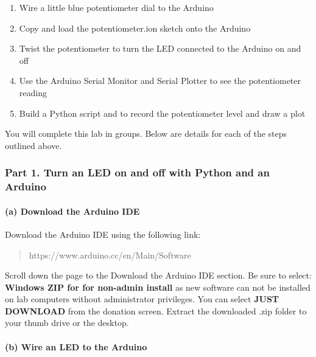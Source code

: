\documentclass[11pt]{article}
\begin{document}
\begin{enumerate}
\def\labelenumi{(\alph{enumi})}
\item
  Wire a little blue potentiometer dial to the Arduino
\item
  Copy and load the potentiometer.ion sketch onto the Arduino
\item
  Twist the potentiometer to turn the LED connected to the Arduino on
  and off
\item
  Use the Arduino Serial Monitor and Serial Plotter to see the
  potentiometer reading
\item
  Build a Python script and to record the potentiometer level and draw a
  plot
\end{enumerate}

    You will complete this lab in groups. Below are details for each of the
steps outlined above.

\hypertarget{part-1.-turn-an-led-on-and-off-with-python-and-an-arduino}{%
\subsubsection{Part 1. Turn an LED on and off with Python and an
Arduino}\label{part-1.-turn-an-led-on-and-off-with-python-and-an-arduino}}

    \hypertarget{a-download-the-arduino-ide}{%
\paragraph{(a) Download the Arduino
IDE}\label{a-download-the-arduino-ide}}

Download the Arduino IDE using the following link:

\begin{quote}
https://www.arduino.cc/en/Main/Software
\end{quote}

Scroll down the page to the Download the Arduino IDE section. Be sure to
select: \textbf{Windows ZIP for for non-admin install} as new software
can not be installed on lab computers without administrator privileges.
You can select \textbf{JUST DOWNLOAD} from the donation screen. Extract
the downloaded .zip folder to your thumb drive or the desktop.

    \hypertarget{b-wire-an-led-to-the-arduino}{%
\paragraph{(b) Wire an LED to the
Arduino}\label{b-wire-an-led-to-the-arduino}}
\end{document}
